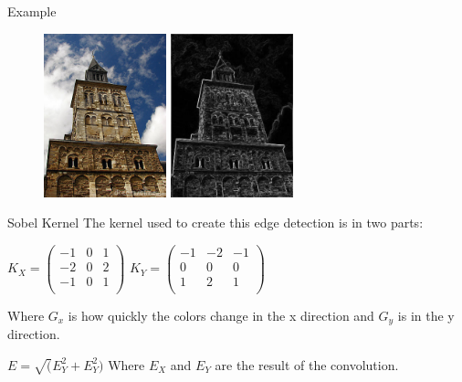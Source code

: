 \documentclass{beamer}
\begin{document}
\begin{frame}{Example}
\begin{figure}[ht]
\includegraphics[width=1.4in]{churchin.jpg}
\hspace{.1in}
\includegraphics[width=1.4in]{churchout.jpg}
\hspace{.1in}
\end{figure}
\end {frame}

\begin{frame}{Sobel Kernel}
The kernel used to create this edge detection is in two parts:\newline

$K_X = \begin{pmatrix}
	-1 & 0 & 1\\
	-2 & 0 & 2\\
	-1 & 0 & 1\\
\end{pmatrix}$
$K_Y = \begin{pmatrix}
	-1 & -2 & -1\\
	0 & 0 & 0\\
	1 & 2 & 1\\
\end{pmatrix}$\newline

Where $G_{x}$ is how quickly the colors change in the x direction and $G_{y}$ is in the y direction.
\newline

$E = \sqrt(E_Y^2+E_Y^2)$ Where $E_X$ and $E_Y$ are the result of the convolution.
\end{frame}
\end{document}
